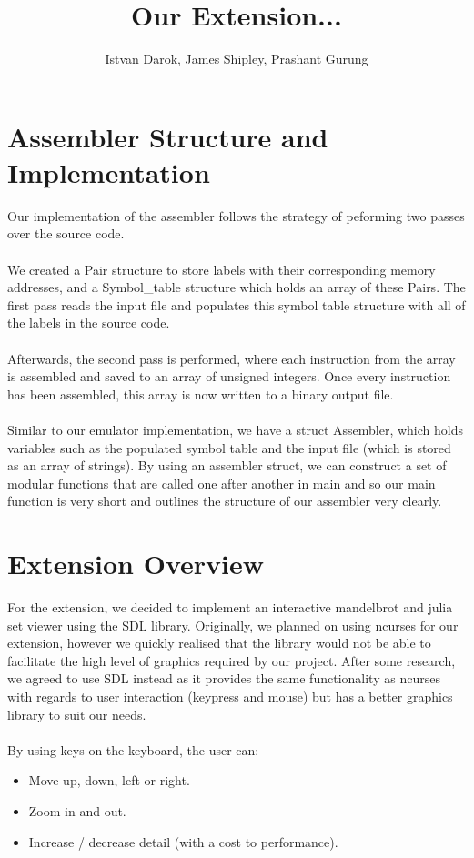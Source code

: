 \documentclass[11pt]{article}
\begin{document}
\title{Our Extension...}
\author{Istvan Darok, James Shipley, Prashant Gurung}

\maketitle

\section {Assembler Structure and Implementation}
Our implementation of the assembler follows the strategy of peforming two passes
over the source code. \\~\\
We created a Pair structure to store labels with their corresponding memory
addresses, and a Symbol\_table structure which holds an array of these Pairs.
The first pass reads the input file and populates this symbol table structure 
with all of the labels in the source code. \\~\\
Afterwards, the second pass is performed,
where each instruction from the array is assembled and saved to an array of 
unsigned integers. Once every instruction has been assembled, this array is
now written to a binary output file. \\~\\
Similar to our emulator implementation, we have a struct 
Assembler, which holds variables such as the populated symbol table and the
input file (which is stored as an array of strings). By using an assembler struct,
we can construct a set of modular functions that are called one after another in
main and so our main function is very short and outlines the structure of our
assembler very clearly.

\section{Extension Overview}
For the extension, we decided to implement an interactive mandelbrot and
julia set viewer using the SDL library. Originally, we planned on using ncurses
for our extension, however we quickly realised that the library would not be able
to facilitate the high level of graphics required by our project.
After some research, we agreed to use SDL instead as it provides the same 
functionality as ncurses with regards to user interaction (keypress and mouse)
but has a better graphics library to suit our needs. \\~\\
By using keys on the keyboard, the user can:
\begin{itemize}
    \item Move up, down, left or right.
    \item Zoom in and out.
    \item Increase / decrease detail  (with a cost to performance).
\end{itemize}
\end{document}

